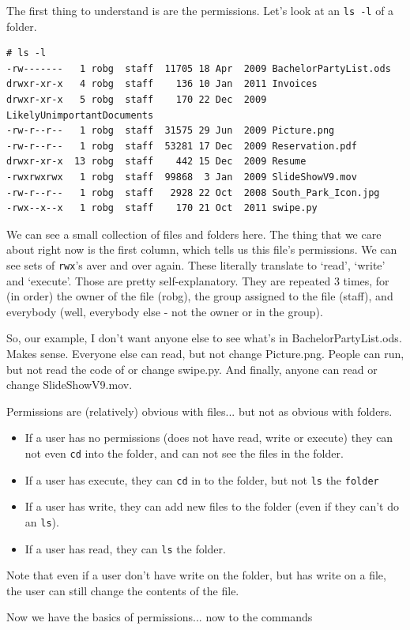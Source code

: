 	The first thing to understand is are the permissions. Let's look at an {\tt ls -l} of a folder.
\begin{verbatim}
# ls -l
-rw-------   1 robg  staff  11705 18 Apr  2009 BachelorPartyList.ods
drwxr-xr-x   4 robg  staff    136 10 Jan  2011 Invoices
drwxr-xr-x   5 robg  staff    170 22 Dec  2009 LikelyUnimportantDocuments
-rw-r--r--   1 robg  staff  31575 29 Jun  2009 Picture.png
-rw-r--r--   1 robg  staff  53281 17 Dec  2009 Reservation.pdf
drwxr-xr-x  13 robg  staff    442 15 Dec  2009 Resume
-rwxrwxrwx   1 robg  staff  99868  3 Jan  2009 SlideShowV9.mov
-rw-r--r--   1 robg  staff   2928 22 Oct  2008 South_Park_Icon.jpg
-rwx--x--x   1 robg  staff    170 21 Oct  2011 swipe.py
\end{verbatim} 
We can see a small collection of files and folders here. The thing that we care about right 
now is the first column, which tells us this file's permissions. We can see sets of 
{\tt rwx}'s aver and over again. These literally translate to `read', `write' and `execute'. 
Those are pretty self-explanatory. They are repeated 3 times, for (in order) the owner of the file (robg),
the group assigned to the file (staff), and everybody (well, everybody else - not the owner or in the group).

So, our example, I don't want anyone else to see what's in BachelorPartyList.ods. Makes sense. Everyone else can 
read, but not change Picture.png. People can run, but not read the code of or change swipe.py. And finally, anyone can
read or change SlideShowV9.mov.

Permissions are (relatively) obvious with files... but not as obvious with folders. 
\begin{itemize}
	\item If a user has no permissions (does not have read, write or execute) they can not even {\tt cd} into the folder, and can not see the files in the folder.
	\item If a user has execute, they can {\tt cd} in to the folder, but not {\tt ls} the {\tt folder}
	\item If a user has write, they can add new files to the folder (even if they can't do an {\tt ls}).
	\item If a user has read, they can {\tt ls} the folder.
\end{itemize}
Note that even if a user don't have write on the folder, but has write on a file, the user can still change the contents of the file.

Now we have the basics of permissions... now to the commands
